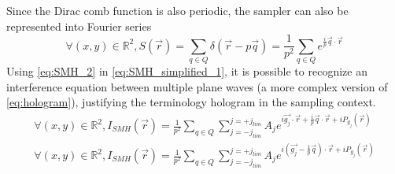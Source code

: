 \documentclass[12pt]{article}
\begin{document}
Since the Dirac comb function is also periodic, the sampler can also be represented into Fourier series
\begin{equation}
\forall (x,y) \in \mathbb{R}^{2}, S(\vec{r})=\sum_{q\in Q}\delta(\vec{r}-p\vec{q}) = \frac{1}{p^2}\sum_{q\in Q}e^{\frac{i}{p}\vec{q}\cdot\vec{r}}
\label{eq:SMH_2}
\end{equation}
Using \cref{eq:SMH_2} in \cref{eq:SMH_simplified_1}, it is possible to recognize an interference equation between multiple plane waves (a more complex version of \cref{eq:hologram}), justifying the terminology hologram in the sampling context.
\begin{equation}
\begin{gathered}
\forall (x,y) \in \mathbb{R}^{2}, I_{SMH}(\vec{r})=\frac{1}{p^2}\sum_{q\in Q}\sum_{j=-j_{lim}}^{j=+j_{lim}}A_je^{i\vec{g_j}\cdot\vec{r}+\frac{i}{p}\vec{q}\cdot\vec{r}+iP_{g_{j}}(\vec{r})} \\
\forall (x,y) \in \mathbb{R}^{2}, I_{SMH}(\vec{r})=\frac{1}{p^2}\sum_{q\in Q}\sum_{j=-j_{lim}}^{j=+j_{lim}}A_je^{i(\vec{g_j}-\frac{1}{p}\vec{q})\cdot\vec{r}+iP_{g_{j}}(\vec{r})}
\end{gathered}
\label{eq:SMH_3}
\end{equation}
\end{document}
